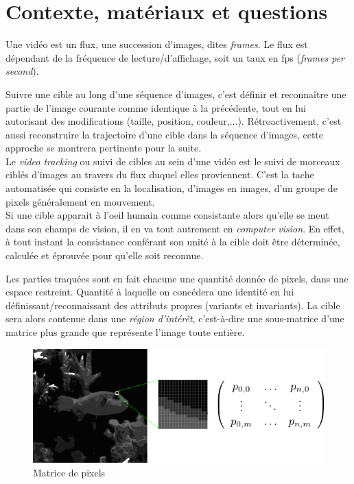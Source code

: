 \documentclass[a4paper,12pt]{report}
\begin{document}
\section{Contexte, matériaux et questions}
Une vidéo est un flux, une succession d'images, dites  \textit{frames}. Le flux est dépendant de la fréquence de lecture/d'affichage, soit un taux en fps (\textit{frames per second}). 

Suivre une cible au long d'une séquence d'images, c'est définir et reconnaître une partie de l'image courante comme identique à la précédente, tout en lui autorisant des modifications (taille, position, couleur,...). Rétroactivement, c'est aussi reconstruire la trajectoire d'une cible dans la séquence d'images, cette approche se montrera pertinente pour la suite.\\

Le \textit{video tracking} ou suivi de cibles au sein d'une vidéo est le suivi de morceaux ciblés d'images au travers du flux duquel elles proviennent. C'est la tache automatisée qui consiste en la localisation, d'images en images, d'un groupe de pixels généralement en mouvement. \\

Si une cible apparait à l'oeil humain comme consistante alors qu'elle se meut dans son champs de vision, il en va tout autrement en \textit{computer vision}. En effet, à tout instant la consistance conférant son unité à la cible doit être déterminée, calculée et éprouvée pour qu'elle soit reconnue. 

Les parties traquées sont en fait chacune une quantité donnée de pixels, dans une espace restreint. Quantité à laquelle on concédera une identité en lui définissant/reconnaissant des attributs propres (variants et invariants). La cible sera alors contenue dans une \textit{région d'intérêt}, c'est-à-dire une sous-matrice d'une matrice plus grande que représente l'image toute entière.\\

\begin{figure}[hbtp]
\centering
\includegraphics[scale=1]{figureImageMatrice.png}
\caption{Matrice de pixels}
\end{figure}
\end{document}
